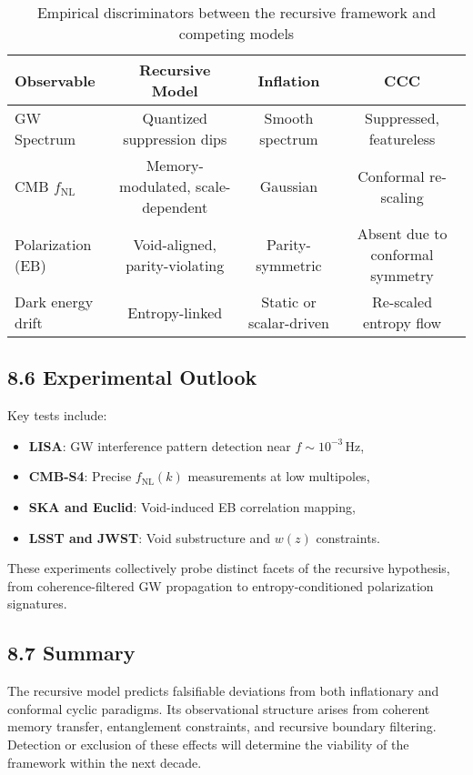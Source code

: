 \begin{table}[H]
\centering
\begin{tabular}{|l|c|c|c|}
\hline
\textbf{Observable} & \textbf{Recursive Model} & \textbf{Inflation} & \textbf{CCC} \\
\hline
GW Spectrum & Quantized suppression dips & Smooth spectrum & Suppressed, featureless \\
CMB \( f_{\text{NL}} \) & Memory-modulated, scale-dependent & Gaussian & Conformal re-scaling \\
Polarization (EB) & Void-aligned, parity-violating & Parity-symmetric & Absent due to conformal symmetry \\
Dark energy drift & Entropy-linked & Static or scalar-driven & Re-scaled entropy flow \\
\hline
\end{tabular}
\caption{Empirical discriminators between the recursive framework and competing models}
\end{table}

\subsection{8.6 Experimental Outlook}

Key tests include:
\begin{itemize}
    \item \textbf{LISA}: GW interference pattern detection near \( f \sim 10^{-3} \,\text{Hz} \),
    \item \textbf{CMB-S4}: Precise \( f_{\text{NL}}(k) \) measurements at low multipoles,
    \item \textbf{SKA and Euclid}: Void-induced EB correlation mapping,
    \item \textbf{LSST and JWST}: Void substructure and \( w(z) \) constraints.
\end{itemize}
These experiments collectively probe distinct facets of the recursive hypothesis, from coherence-filtered GW propagation to entropy-conditioned polarization signatures.

\subsection{8.7 Summary}

The recursive model predicts falsifiable deviations from both inflationary and conformal cyclic paradigms. Its observational structure arises from coherent memory transfer, entanglement constraints, and recursive boundary filtering. Detection or exclusion of these effects will determine the viability of the framework within the next decade.
